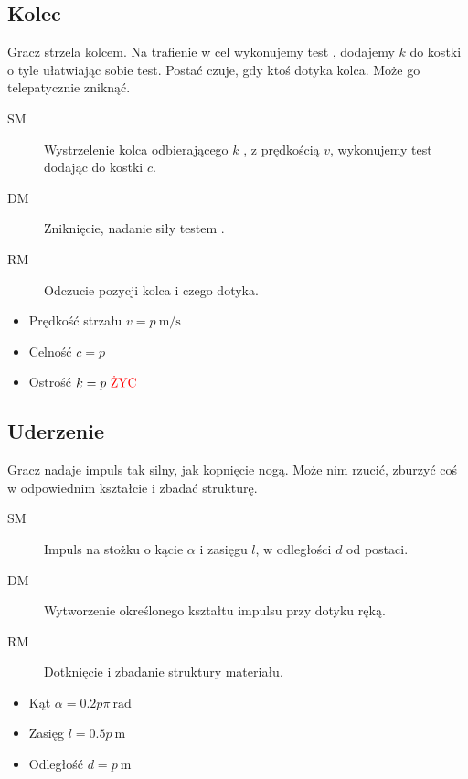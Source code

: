 \subsection{Kolec}
Gracz strzela kolcem.
Na trafienie w cel wykonujemy test \aba{}, dodajemy $k$ do kostki o tyle ułatwiając sobie test.
Postać czuje, gdy ktoś dotyka kolca.
Może go telepatycznie zniknąć.
\begin{description}
	\item[SM] Wystrzelenie kolca odbierającego $k$ \abzyc{}, z prędkością $v$, wykonujemy test \aba{} dodając do kostki $c$.
	\item[DM] Zniknięcie, nadanie siły testem \abs{}.
	\item[RM] Odczucie pozycji kolca i czego dotyka.
\end{description}
\begin{itemize}
	\item Prędkość strzału $v = p \ \si{\metre\per\second}$
	\item Celność $c = p$
	\item Ostrość $k = p \ \text{\abzyc{}}$
\end{itemize}

\subsection{Uderzenie}
Gracz nadaje impuls tak silny, jak kopnięcie nogą.
Może nim rzucić, zburzyć coś w odpowiednim kształcie i zbadać strukturę.
\begin{description}
	\item[SM] Impuls na stożku o kącie $\alpha$ i zasięgu $l$, w odległości $d$ od postaci.
	\item[DM] Wytworzenie określonego kształtu impulsu przy dotyku ręką.
	\item[RM] Dotknięcie i zbadanie struktury materiału.
\end{description}
\begin{itemize}
	\item Kąt $\alpha = 0.2p\pi \ \si{\radian}$
	\item Zasięg $l = 0.5p \ \si{\meter}$
	\item Odległość $d = p \ \si{\meter}$
\end{itemize}

